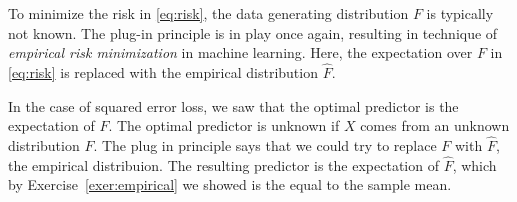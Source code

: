 \documentclass[11pt]{article}
\theoremstyle{definition}
\begin{document}
$\quad$

To minimize the risk in \eqref{eq:risk}, the data generating distribution
$F$ is typically not known.
The plug-in principle is in play once again, resulting in technique of
\textit{empirical risk minimization} in machine learning.
Here, the expectation over $F$ in \eqref{eq:risk} is replaced with the empirical
distribution $\hat F$.

In the case of squared error loss, we saw that the optimal predictor is the
expectation of $F$.
The optimal predictor is unknown if $X$ comes from an unknown distribution $F$.
The plug in principle says that we could try to replace $F$ with $\hat F$,
the empirical distribuion.
The resulting predictor is the expectation of $\hat F$, which by
Exercise~\ref{exer:empirical} we showed is the equal to the sample mean.
\end{document}
